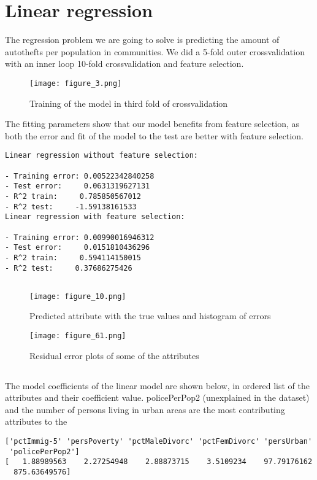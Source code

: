\documentclass[a4paper,10pt]{article}
\begin{document}
\author{Valentin Rosenberg, Zacharias Knudsen}
\date{\today}

\section{Linear regression}
The regression problem we are going to solve is predicting the amount of autothefts per population in communities. We did a 5-fold outer crossvalidation with an inner loop 10-fold crossvalidation and feature selection. 

\begin{figure}[ht]
   \centerline{\texttt{[image: figure\_3.png]}}
  \caption{Training of the model in third fold of crossvalidation}
\end{figure}

The fitting parameters show that our model benefits from feature selection, as both the error and fit of the model to the test are better with feature selection.
\begin{verbatim}
Linear regression without feature selection:

- Training error: 0.00522342840258
- Test error:     0.0631319627131
- R^2 train:     0.785850567012
- R^2 test:     -1.59138161533
Linear regression with feature selection:

- Training error: 0.00990016946312
- Test error:     0.0151810436296
- R^2 train:     0.594114150015
- R^2 test:     0.37686275426
\end{verbatim}

\subsection{}

\begin{figure}[ht]
   \centerline{\texttt{[image: figure\_10.png]}}
  \caption{Predicted attribute with the true values and histogram of errors}
\end{figure}

\begin{figure}[ht]
   \centerline{\texttt{[image: figure\_61.png]}}
  \caption{Residual error plots of some of the attributes}
\end{figure}

\subsection{}
The model coefficients of the linear model are shown below, in ordered list of the attributes and their coefficient value. policePerPop2 (unexplained in the dataset) and the number of persons living in urban areas are the most contributing attributes to the
\begin{verbatim}
['pctImmig-5' 'persPoverty' 'pctMaleDivorc' 'pctFemDivorc' 'persUrban'
 'policePerPop2']
[   1.88989563    2.27254948    2.88873715    3.5109234    97.79176162
  875.63649576]
\end{verbatim}
\end{document}
